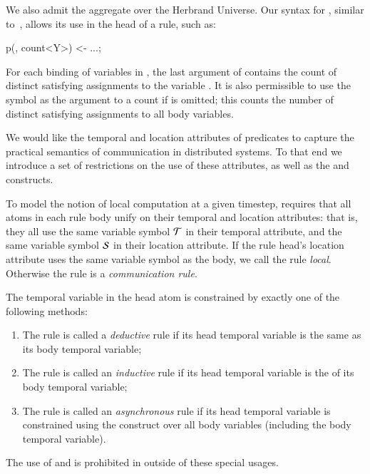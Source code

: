 We also admit the  aggregate over the Herbrand Universe.  Our syntax for , similar to~\cite{datalog-agg}, allows its use in the head of a rule, such as:

\begin{Dedalus}
p(, count<Y>) <- ...;
\end{Dedalus}

For each binding of variables in , the last argument of  contains the count of distinct satisfying assignments to the variable .  It is also permissible to use the symbol \dedalus{*} as the argument to a count if  is omitted; this counts the number of distinct satisfying assignments to all body variables.


\vspace{1em}
We would like the temporal and location attributes of \lang predicates to capture the practical semantics of communication in distributed systems.  To that end we introduce a set of restrictions on the use of these attributes, as well as the  and  constructs.

To model the notion of local computation at a given timestep, \lang requires that all atoms in each rule body unify on their temporal and location attributes: that is, they all use the same variable symbol $\Tau$ in their temporal attribute, and the same variable symbol $\SDedalus$ in their location attribute.  If the rule head's location attribute uses the same variable symbol as the body, we call the rule {\em local}.  Otherwise the rule is a {\em communication rule}.

The temporal variable in the head atom is constrained by exactly one of the following methods:
\begin{enumerate}
\item The rule is called a {\em deductive} rule if its head temporal variable is the same as its body temporal variable;
\item The rule is called an {\em inductive} rule if its head temporal variable is the  of its body temporal variable;
\item The rule is called an {\em asynchronous} rule if its head temporal variable is constrained using the  construct over all body variables (including the body temporal variable).
\end{enumerate}
The use of  and  is prohibited in \lang outside of these special usages.

